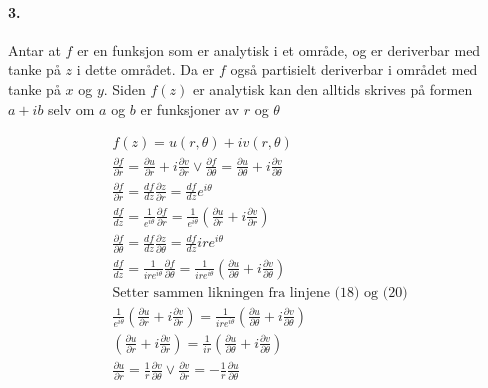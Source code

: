 \documentclass[11pt, A4paper,norsk]{article}
\begin{document}
		\paragraph{3.}
			\begin{flushleft}
Antar at $f$ er en funksjon som er analytisk i et område, og er deriverbar med tanke på $z$ i dette området. Da er $f$ også partisielt deriverbar i området med tanke på $x$ og $y$. Siden $f(z)$ er analytisk kan den alltids skrives på formen $a + ib$ selv om $a$ og $b$ er funksjoner av $r$ og $\theta$
			\end{flushleft}
			\begin{gather}
f(z) = u(r, \theta) + iv(r, \theta) \\
\frac{\partial f}{\partial r} = \frac{\partial u}{\partial r} + i \frac{\partial v}{\partial r} \vee \frac{\partial f}{\partial \theta} = \frac{\partial u}{\partial \theta} + i \frac{\partial v}{\partial \theta} \\
\frac{\partial f}{\partial r} = \frac{df}{dz} \frac{\partial z}{\partial r} = \frac{df}{dz} e^{i \theta} \\
\frac{df}{dz} = \frac{1}{e^{i \theta}} \frac{\partial f}{\partial r} = \frac{1}{e^{i \theta}} \left(\frac{\partial u}{\partial r} + i\frac{\partial v}{\partial r}\right) \\
\frac{\partial f}{\partial \theta} = \frac{df}{dz} \frac{\partial z}{\partial \theta} = \frac{df}{dz} ire^{i \theta} \\
\frac{df}{dz} = \frac{1}{ire^{i \theta}} \frac{\partial f}{\partial \theta} = \frac{1}{ire^{i \theta}} \left(\frac{\partial u}{\partial \theta} + i\frac{\partial v}{\partial \theta}\right) \\
\text{Setter sammen likningen fra linjene (18) og (20)} \nonumber \\
\frac{1}{e^{i \theta}} \left(\frac{\partial u}{\partial r} + i\frac{\partial v}{\partial r}\right) = \frac{1}{ire^{i \theta}} \left(\frac{\partial u}{\partial \theta} + i\frac{\partial v}{\partial \theta}\right) \\
\left(\frac{\partial u}{\partial r} + i\frac{\partial v}{\partial r}\right) = \frac{1}{ir} \left(\frac{\partial u}{\partial \theta} + i\frac{\partial v}{\partial \theta}\right) \\
\frac{\partial u}{\partial r} = \frac{1}{r} \frac{\partial v}{\partial \theta} \vee \frac{\partial v}{\partial r} = - \frac{1}{r} \frac{\partial u}{\partial \theta}
			\end{gather}
\end{document}
